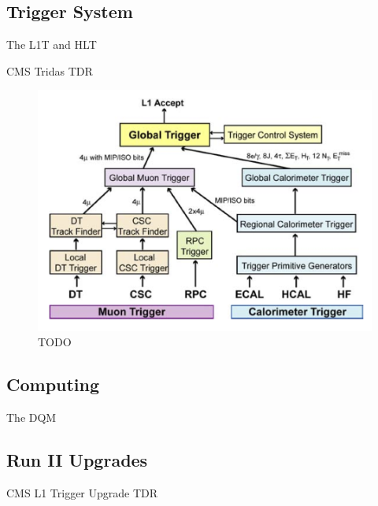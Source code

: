 \subsection{Trigger System}
\label{SUBSECTION:ExperimentalApparatus_CMS_Trigger}

The \gls{L1T} and \gls{HLT}

CMS Tridas TDR\cite{CMSTDR:CMSTridasTDR} 

\begin{figure}[!htb]
  \centering
  \includegraphics{Chapter02/CMS/Images/CMS_L1T_Layout.png}
  \caption{TODO}
  \label{FIGURE:ExperimentalApparatus_CMS_L1T_Layout}
\end{figure}

\subsection{Computing}
\label{SUBSECTION:ExperimentalApparatus_CMS_Computing}

The \gls{DQM} 

\subsection{Run II Upgrades}
\label{SUBSECTION:ExperimentalApparatus_CMS_RUNII}

CMS L1 Trigger Upgrade TDR\cite{CMSTDR:CMSL1Upgrade}

